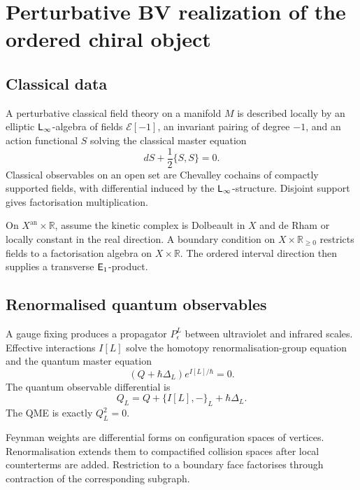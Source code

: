 \chapter{Perturbative BV realization of the ordered chiral object}\label{chap:bv}

\section{Classical data}
A perturbative classical field theory on a manifold \(M\) is described locally by an elliptic \(\mathsf L_\infty\)-algebra of fields \(\mathcal E[-1]\), an invariant pairing of degree \(-1\), and an action functional \(S\) solving the classical master equation
\[
 dS+\frac12\{S,S\}=0.
\]
Classical observables on an open set are Chevalley cochains of compactly supported fields, with differential induced by the \(\mathsf L_\infty\)-structure.  Disjoint support gives factorisation multiplication.

On \(X^{\mathrm{an}}\times\mathbb R\), assume the kinetic complex is Dolbeault in \(X\) and de Rham or locally constant in the real direction.  A boundary condition on \(X\times\mathbb R_{\ge0}\) restricts fields to a factorisation algebra on \(X\times\mathbb R\).  The ordered interval direction then supplies a transverse \(\mathsf E_1\)-product.

\section{Renormalised quantum observables}
A gauge fixing produces a propagator \(P_\epsilon^L\) between ultraviolet and infrared scales.  Effective interactions \(I[L]\) solve the homotopy renormalisation-group equation and the quantum master equation
\[
 (Q+\hbar\Delta_L)e^{I[L]/\hbar}=0.
\]
The quantum observable differential is
\[
 Q_L=Q+\{I[L],-\}_L+\hbar\Delta_L.
\]
The QME is exactly \(Q_L^2=0\).

Feynman weights are differential forms on configuration spaces of vertices.  Renormalisation extends them to compactified collision spaces after local counterterms are added.  Restriction to a boundary face factorises through contraction of the corresponding subgraph.

